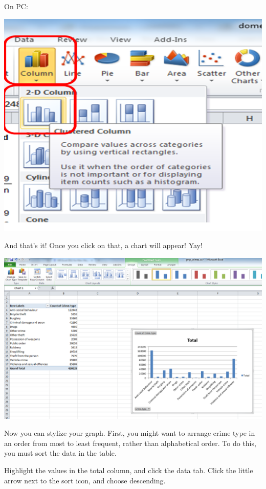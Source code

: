 \documentclass[]{book}
\theoremstyle{definition}
\theoremstyle{definition}
\theoremstyle{definition}
\theoremstyle{remark}
\begin{document}
On PC:

\includegraphics{imgs/pc_cluster_bar.png}

And that's it! Once you click on that, a chart will appear! Yay!

\includegraphics{imgs/chart_appears.png}

Now you can stylize your graph. First, you might want to arrange crime
type in an order from most to least frequent, rather than alphabetical
order. To do this, you must sort the data in the table.

Highlight the values in the total column, and click the data tab. Click
the little arrow next to the sort icon, and choose descending.
\end{document}

